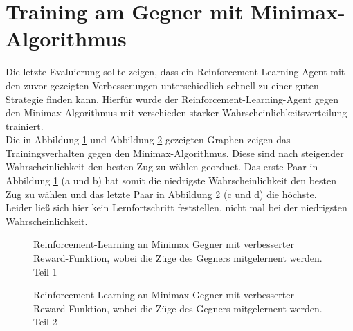 \section{Training am Gegner mit Minimax-Algorithmus}
Die letzte Evaluierung sollte zeigen, dass ein Reinforcement-Learning-Agent mit den zuvor gezeigten Verbesserungen unterschiedlich schnell zu einer guten Strategie finden kann. 
Hierfür wurde der Reinforcement-Learning-Agent gegen den Minimax-Algorithmus mit verschieden starker Wahrscheinlichkeitsverteilung trainiert.\\
Die in Abbildung \ref{fig:MiniMaxReward1} und Abbildung \ref{fig:MiniMaxReward2} gezeigten Graphen zeigen das Trainingsverhalten gegen den Minimax-Algorithmus. Diese sind nach steigender Wahrscheinlichkeit den besten Zug zu wählen geordnet. Das erste Paar in Abbildung \ref{fig:MiniMaxReward1} (a und b) hat somit die niedrigste Wahrscheinlichkeit den besten Zug zu wählen und das letzte Paar in Abbildung \ref{fig:MiniMaxReward2} (c und d) die höchste.\\
Leider ließ sich hier kein Lernfortschritt feststellen, nicht mal bei der niedrigsten Wahrscheinlichkeit. 

\begin{figure}%
    \centering
    \qquad
    \qquad
    \qquad
    \qquad
    \qquad
    \qquad
    \qquad
    \caption{Reinforcement-Learning an Minimax Gegner mit verbesserter Reward-Funktion, wobei die Züge des Gegners mitgelernent werden. Teil 1}%
    \label{fig:MiniMaxReward1}%
\end{figure}
\begin{figure}%
    \centering
    \qquad
    \qquad
    \qquad
    \caption{Reinforcement-Learning an Minimax Gegner mit verbesserter Reward-Funktion, wobei die Züge des Gegners mitgelernent werden. Teil 2}%
    \label{fig:MiniMaxReward2}%
\end{figure}

